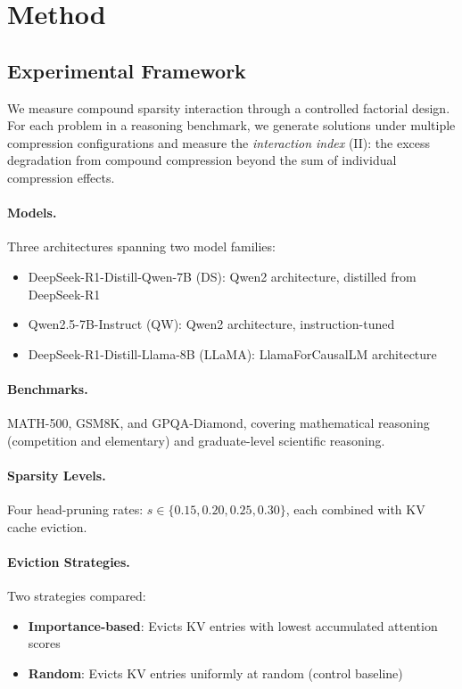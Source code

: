 \documentclass[11pt,a4paper]{article}
\begin{document}
\section{Method}

\subsection{Experimental Framework}

We measure compound sparsity interaction through a controlled factorial design. For each problem in a reasoning benchmark, we generate solutions under multiple compression configurations and measure the \emph{interaction index} (II): the excess degradation from compound compression beyond the sum of individual compression effects.

\paragraph{Models.} Three architectures spanning two model families:
\begin{itemize}
\item DeepSeek-R1-Distill-Qwen-7B (DS): Qwen2 architecture, distilled from DeepSeek-R1
\item Qwen2.5-7B-Instruct (QW): Qwen2 architecture, instruction-tuned
\item DeepSeek-R1-Distill-Llama-8B (LLaMA): LlamaForCausalLM architecture
\end{itemize}

\paragraph{Benchmarks.} MATH-500, GSM8K, and GPQA-Diamond, covering mathematical reasoning (competition and elementary) and graduate-level scientific reasoning.

\paragraph{Sparsity Levels.} Four head-pruning rates: $s \in \{0.15, 0.20, 0.25, 0.30\}$, each combined with KV cache eviction.

\paragraph{Eviction Strategies.} Two strategies compared:
\begin{itemize}
\item \textbf{Importance-based}: Evicts KV entries with lowest accumulated attention scores
\item \textbf{Random}: Evicts KV entries uniformly at random (control baseline)
\end{itemize}
\end{document}
